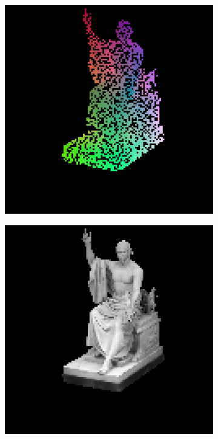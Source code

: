 \begin{figure}
	
	\begin{subfigure}[b]{0.19\linewidth}
		\includegraphics[width=\linewidth]{./Figures/gcnn_synthetic/fancy_eval_3_point_cloud_noise.png}
	\end{subfigure}
	\begin{subfigure}[b]{0.19\linewidth}
	\includegraphics[width=\linewidth]{./Figures/gcnn_synthetic/fancy_eval_3_img.png}

\end{subfigure}
\end{figure}
